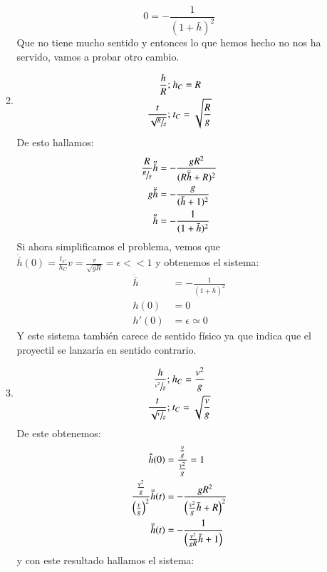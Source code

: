 \begin{ex}[H1.4]
\begin{enumerate}[a)]
\begin{enumerate}[(1)]
            $$
                0 =  -\frac{1}{(1+\bar h)^2}
            $$
            Que no tiene mucho sentido y entonces lo que hemos hecho no nos ha servido, vamos a probar otro cambio.
            \item
            \begin{align*}
                \frac{h}{R};&\ h_C = R\\
                \frac{t}{\sqrt{\sfrac{R}{g}}};&\ t_C = \sqrt{\frac{R}{g}}
            \end{align*}
            De esto hallamos:
            \begin{align*}
                \frac{R}{\sfrac{R}{g}} \ddot{\bar h} &= - \frac{gR^2}{(R\ddot{\bar h} + R)^2}\\
                g\ddot{\bar h} &= -\frac{g}{(\bar h + 1)^2}\\
                \ddot{\bar h} &= - \frac{1}{(1+\bar h)^2}
            \end{align*}
            Si ahora simplificamos el problema, vemos que $\dot{\bar h}(0) = \frac{t_C}{h_C} v = \frac{v}{\sqrt{g R}} = \epsilon << 1$ y obtenemos el sistema:
            \begin{align*}
                \ddot{\bar h} &= - \frac{1}{(1+\bar h)^2}\\
                h(0) &= 0\\
                h'(0) &= \epsilon \simeq 0
            \end{align*}
            Y este sistema también carece de sentido físico ya que indica que el proyectil se lanzaría en sentido contrario.
            \item
            \begin{align*}
                \frac{h}{\sfrac{v^2}{g}};&\ h_C = \frac{v^2}{g}\\
                \frac{t}{\sqrt{\sfrac{v}{g}}};&\ t_C = \sqrt{\frac{v}{g}}
            \end{align*}
            De este obtenemos:
            \begin{align*}
                \dot{\bar {h}} (0) &= \frac{ \frac{v}{g}  }{ \frac{v^2}{g} } = 1\\
                \frac{ \frac{v^2}{g}  }{ \left(\frac{v}{g}\right)^2 } \ddot{\bar h}(t) &= -\frac{gR^2}{\left(\frac{v^2}{g}\bar h + R\right)^2}\\
                \ddot{\bar h}(t) &= - \frac{1}{\left( \frac{v^2}{gR} \bar h + 1 \right)}
            \end{align*}
            y con este resultado hallamos el sistema:
            \begin{align*}

\end{align*}
\end{enumerate}
\end{enumerate}
\end{ex}
